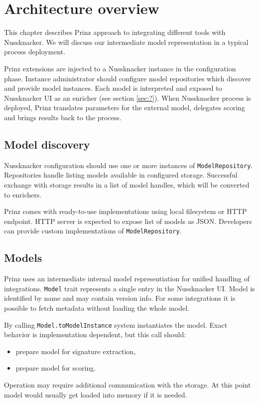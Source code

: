 \chapter{Architecture overview}
\label{chap:arch}

This chapter describes Prinz approach to integrating different tools with Nussknacker.
We will discuss our intermediate model representation in a typical process deployment.

Prinz extensions are injected to a Nussknacker instance in the configuration phase.
Instance administrator should configure model repositories which discover and provide model instances.
Each model is interpreted and exposed to Nussknacker UI as an enricher (see section \ref{sec:?}).
When Nussknacker process is deployed, Prinz translates parameters for the external model, delegates scoring and brings results back to the process.

\section{Model discovery}

Nussknacker configuration should use one or more instances of \texttt{ModelRepository}.
Repositories handle listing models available in configured storage.
Successful exchange with storage results in a list of model handles, which will be converted to enrichers.

Prinz comes with ready-to-use implementations using local filesystem or HTTP endpoint.
HTTP server is expected to expose list of models as JSON.
Developers can provide custom implementations of \texttt{ModelRepository}.

\section{Models}

Prinz uses an intermediate internal model representiation for unified handling of integrations.
\texttt{Model} trait represents a single entry in the Nussknacker UI.
Model is identified by name and may contain version info.
For some integrations it is possible to fetch metadata without loading the whole model.

By calling \texttt{Model.toModelInstance} system instantiates the model.
Exact behavior is implementation dependent, but this call should:
\begin{itemize}
	\item prepare model for signature extraction,
	\item prepare model for scoring.
\end{itemize}
Operation may require additional communication with the storage.
At this point model would usually get loaded into memory if it is needed.

